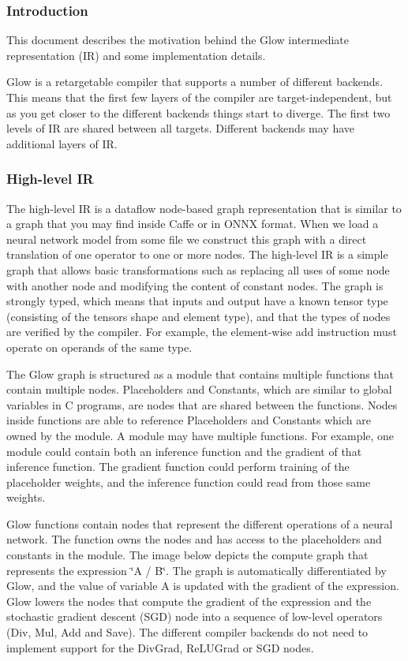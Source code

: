 \subsubsection*{Introduction}

This document describes the motivation behind the Glow intermediate representation (IR) and some implementation details.

Glow is a retargetable compiler that supports a number of different backends. This means that the first few layers of the compiler are target-\/independent, but as you get closer to the different backends things start to diverge. The first two levels of IR are shared between all targets. Different backends may have additional layers of IR.

\subsubsection*{High-\/level IR}

The high-\/level IR is a dataflow node-\/based graph representation that is similar to a graph that you may find inside Caffe or in O\+N\+NX format. When we load a neural network model from some file we construct this graph with a direct translation of one operator to one or more nodes. The high-\/level IR is a simple graph that allows basic transformations such as replacing all uses of some node with another node and modifying the content of constant nodes. The graph is strongly typed, which means that inputs and output have a known tensor type (consisting of the tensor\textquotesingle{}s shape and element type), and that the types of nodes are verified by the compiler. For example, the element-\/wise add instruction must operate on operands of the same type.

The Glow graph is structured as a module that contains multiple functions that contain multiple nodes. Placeholders and Constants, which are similar to global variables in C programs, are nodes that are shared between the functions. Nodes inside functions are able to reference Placeholders and Constants which are owned by the module. A module may have multiple functions. For example, one module could contain both an inference function and the gradient of that inference function. The gradient function could perform training of the placeholder weights, and the inference function could read from those same weights.



Glow functions contain nodes that represent the different operations of a neural network. The function owns the nodes and has access to the placeholders and constants in the module. The image below depicts the compute graph that represents the expression \char`\"{}\+A / B\char`\"{}. The graph is automatically differentiated by Glow, and the value of variable A is updated with the gradient of the expression. Glow lowers the nodes that compute the gradient of the expression and the stochastic gradient descent (S\+GD) node into a sequence of low-\/level operators (Div, Mul, Add and Save). The different compiler backends do not need to implement support for the Div\+Grad, Re\+L\+U\+Grad or S\+GD nodes.

